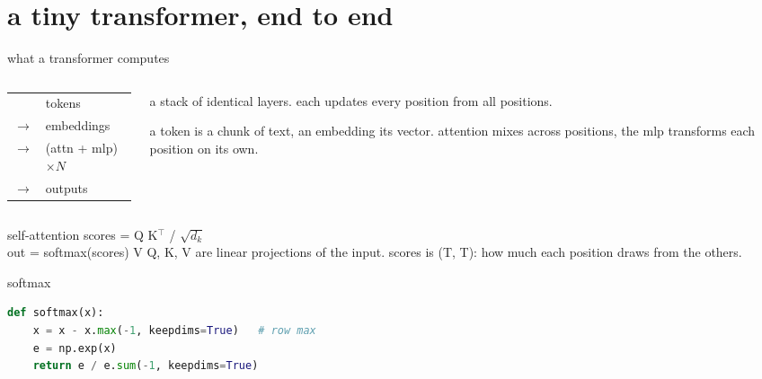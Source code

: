   \section{a tiny transformer, end to end}
  \begin{frame}{what a transformer computes}
    \vfill
    \begin{columns}[T]
      \begin{column}{0.5\textwidth}
        {\ttfamily\large\color{cwTeal}%
          \renewcommand{\arraystretch}{1.7}%
          \begin{tabular}{@{}r@{~~}l@{}}
                  & tokens \\
            $\to$ & embeddings \\
            $\to$ & (attn + mlp) $\times N$ \\
            $\to$ & outputs \\
          \end{tabular}}
      \end{column}
      \begin{column}{0.46\textwidth}
        {\cwhankenbody\normalsize\color{cwInk}
          a stack of identical layers. each updates every position from all positions.\par}
        \vspace{1em}
        {\cwhankenbody\small\color{cwMuted}
          a token is a chunk of text, an embedding its vector. attention mixes
          across positions, the mlp transforms each position on its own.\par}
      \end{column}
    \end{columns}
    \vfill
  \end{frame}

  \begin{frame}{self-attention}
      {scores = Q K$^\top$ / $\sqrt{d_k}$ \\[0.4em] out = softmax(scores) V}
      {Q, K, V are linear projections of the input. scores is (T, T): how much each
       position draws from the others.}
  \end{frame}

  \begin{frame}[fragile]{softmax}
    \vfill
\begin{lstlisting}[language=Python]
def softmax(x):
    x = x - x.max(-1, keepdims=True)   # row max
    e = np.exp(x)
    return e / e.sum(-1, keepdims=True)
\end{lstlisting}
    \vskip6pt
  \end{frame}

